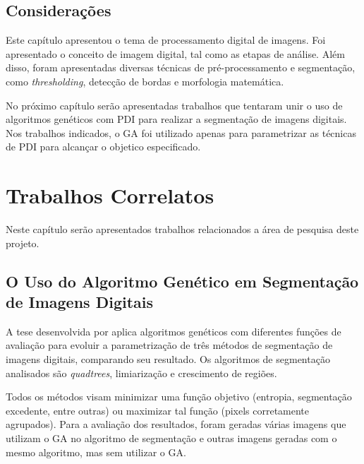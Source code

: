 \documentclass[12pt,oneside,a4paper,english,french,spanish,brazil,]{abntex2}
\begin{document}
\section{Considerações}

Este capítulo apresentou o tema de processamento digital de imagens. Foi apresentado o conceito de imagem digital, tal como as etapas de análise. Além disso, foram apresentadas diversas técnicas de pré-processamento e segmentação, como \textit{thresholding}, detecção de bordas e morfologia matemática.

No próximo capítulo serão apresentadas trabalhos que tentaram unir o uso de algoritmos genéticos com PDI para realizar a segmentação de imagens digitais. Nos trabalhos indicados, o GA foi utilizado apenas para parametrizar as técnicas de PDI para alcançar o objetico especificado.

\chapter{Trabalhos Correlatos}
\label{chap:TrabalhosCorrelatos}

Neste capítulo serão apresentados trabalhos relacionados a área de pesquisa deste projeto.


\section{O Uso do Algoritmo Genético em Segmentação de Imagens Digitais}

A tese desenvolvida por \citet{matias:2007} aplica algoritmos genéticos com diferentes funções de avaliação para evoluir a parametrização de três métodos de segmentação de imagens digitais, comparando seu resultado. Os algoritmos de segmentação analisados são \textit{quadtrees}, limiarização e crescimento de regiões.

Todos os métodos visam minimizar uma função objetivo (entropia, segmentação excedente, entre outras) ou maximizar tal função (pixels corretamente agrupados). Para a avaliação dos resultados, foram geradas várias imagens que utilizam o GA no algoritmo de segmentação e outras imagens geradas com o mesmo algoritmo, mas sem utilizar o GA. 
\end{document}
